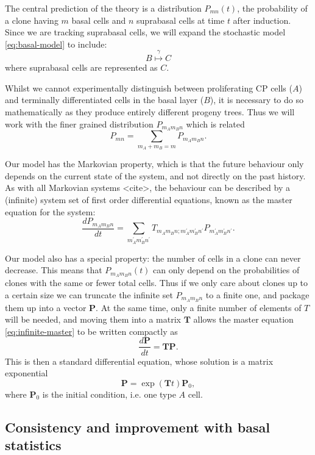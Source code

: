 \documentclass[10pt,UKenglish]{article}
\begin{document}
The central prediction of the theory is a distribution $P_{mn}(t)$, the probability of a clone having $m$ basal cells and $n$ suprabasal cells at time $t$ after induction. Since we are tracking suprabasal cells, we will expand the stochastic model \ref{eq:basal-model} to include:
\begin{equation*}
B \overset{\gamma}{\longmapsto} C
\end{equation*}
where suprabasal cells are represented as $C$.

Whilst we cannot experimentally distinguish between proliferating CP cells ($A$) and terminally differentiated cells in the basal layer ($B$), it is necessary to do so mathematically as they produce entirely different progeny trees. Thus we will work with the finer grained distribution $P_{m_A m_B n}$ which is related $$P_{mn} = \sum_{m_A + m_B = m} P_{m_A m_B n}.$$ 

Our model has the Markovian property, which is that the future behaviour only depends on the current state of the system, and not directly on the past history. As with all Markovian systems <cite>, the behaviour can be described by a (infinite) system set of first order differential equations, known as the master equation for the system: 
\begin{equation}
\frac{dP_{m_A m_B n}}{dt} = \sum_{m_A^\prime m_B^\prime n^\prime} T_{m_A m_B n; m_A^\prime m_B^\prime n^\prime} P_{m_A^\prime m_B^\prime n^\prime}. \label{eq:infinite-master}
\end{equation}

Our model also has a special property: the number of cells in a clone can never decrease. This means that $P_{m_A m_B n}(t)$ can only depend on the probabilities of clones with the same or fewer total cells. Thus if we only care about clones up to a certain size we can truncate the infinite set $P_{m_A m_B n}$ to a finite one, and package them up into a vector $\mathbf P$. At the same time, only a finite number of elements of $T$ will be needed, and moving them into a matrix $\mathbf T$ allows the master equation \eqref{eq:infinite-master} to be written compactly as $$\frac{d\mathbf P}{dt} = \mathbf{T P}.$$ This is then a standard differential equation, whose solution is a matrix exponential $$\mathbf P = \exp(\mathbf T t) \mathbf P_0,$$ where $\mathbf P_0$ is the initial condition, i.e. one type $A$ cell.

\subsection{\label{sec:ball-plane}Consistency and improvement with basal statistics}
\end{document}
